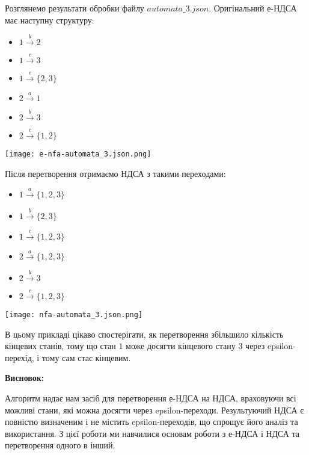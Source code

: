 \documentclass[12pt,a4paper]{article}
\begin{document}
Розглянемо результати обробки файлу \( automata\_3.json \). Оригінальний е-НДСА має наступну структуру:

\begin{itemize}
    \item \(1 \xrightarrow{b} 2\)
    \item \(1 \xrightarrow{c} 3\)
    \item \(1 \xrightarrow{e} \{2, 3\}\)
    \item \(2 \xrightarrow{a} 1\)
    \item \(2 \xrightarrow{b} 3\)
    \item \(2 \xrightarrow{c} \{1, 2\}\)
\end{itemize}

\texttt{[image: e-nfa-automata\_3.json.png]}

Після перетворення отримаємо НДСА з такими переходами:
\begin{itemize}
    \item \(1 \xrightarrow{a} \{1, 2, 3\}\)
    \item \(1 \xrightarrow{b} \{2, 3\}\)
    \item \(1 \xrightarrow{c} \{1, 2, 3\}\)
    \item \(2 \xrightarrow{a} \{1, 2, 3\}\)
    \item \(2 \xrightarrow{b} 3\)
    \item \(2 \xrightarrow{c} \{1, 2, 3\}\)
\end{itemize}

\texttt{[image: nfa-automata\_3.json.png]}

В цьому прикладі цікаво спостерігати, як перетворення збільшило кількість кінцевих станів, тому що стан \(1\) може досягти кінцевого стану \(3\) через epsilon-перехід, і тому сам стає кінцевим.

\vspace{1em}
\textbf{Висновок:}
\vspace{0.5em}

Алгоритм надає нам засіб для перетворення е-НДСА на НДСА, враховуючи всі можливі стани, які можна досягти через epsilon-переходи. Результуючий НДСА є повністю визначеним і не містить epsilon-переходів, що спрощує його аналіз та використання. З цієї роботи ми навчилися основам роботи з е-НДСА і НДСА та перетворення одного в інший.
\end{document}
